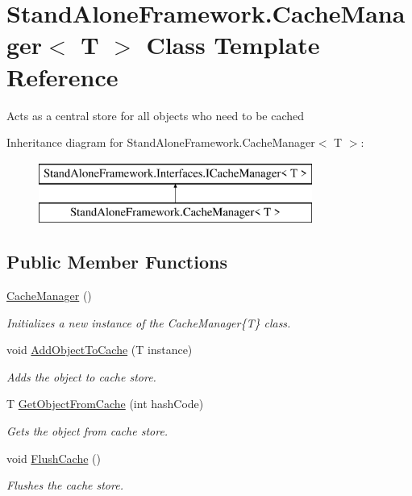 \hypertarget{class_stand_alone_framework_1_1_cache_manager_3_01_t_01_4}{\section{Stand\+Alone\+Framework.\+Cache\+Manager$<$ T $>$ Class Template Reference}
\label{class_stand_alone_framework_1_1_cache_manager_3_01_t_01_4}
}


Acts as a central store for all objects who need to be cached  


Inheritance diagram for Stand\+Alone\+Framework.\+Cache\+Manager$<$ T $>$\+:\begin{figure}[H]
\begin{center}
\leavevmode
\includegraphics[height=2.000000cm]{class_stand_alone_framework_1_1_cache_manager_3_01_t_01_4}
\end{center}
\end{figure}
\subsection*{Public Member Functions}
\begin{DoxyCompactItemize}
\item 
\hyperlink{class_stand_alone_framework_1_1_cache_manager_3_01_t_01_4_a12dfe46d4b252229dc2a039fc5284672}{Cache\+Manager} ()
\begin{DoxyCompactList}\small\item\em Initializes a new instance of the Cache\+Manager\{\+T\} class. \end{DoxyCompactList}\item 
void \hyperlink{class_stand_alone_framework_1_1_cache_manager_3_01_t_01_4_aa50da1a72eee451e267bb4e2927ebb96}{Add\+Object\+To\+Cache} (T instance)
\begin{DoxyCompactList}\small\item\em Adds the object to cache store. \end{DoxyCompactList}\item 
T \hyperlink{class_stand_alone_framework_1_1_cache_manager_3_01_t_01_4_a37a6e63d5523b967266e4abbc778de95}{Get\+Object\+From\+Cache} (int hash\+Code)
\begin{DoxyCompactList}\small\item\em Gets the object from cache store. \end{DoxyCompactList}\item 
void \hyperlink{class_stand_alone_framework_1_1_cache_manager_3_01_t_01_4_a794235bffdaeb6e34a6b715bbeeacdef}{Flush\+Cache} ()
\begin{DoxyCompactList}\small\item\em Flushes the cache store. \end{DoxyCompactList}\end{DoxyCompactItemize}
